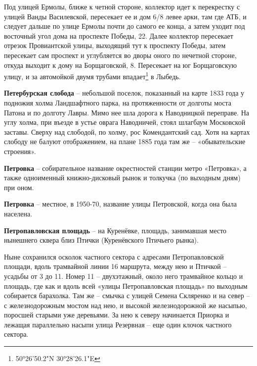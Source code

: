 Под улицей Ермолы, ближе к четной стороне, коллектор идет к перекрестку с улицей Ванды Василевской, пересекает ее и дом 6/8 левее арки, там где АТБ, и следует дальше по улице Ермолы почти до самого ее конца, а затем уходит под восточный угол дома на проспекте Победы, 22. Далее коллектор пересекает отрезок Провиантской улицы, выходящий тут к проспекту Победы, затем пересекает сам проспект и углубляется во дворы оного по нечетной стороне, откуда выходит к дому на Борщаговской, 8. Пересекает на юг Борщаговскую улицу, и за автомойкой двумя трубами впадает\footnote{50°26'50.2"N 30°28'26.1"E} в Лыбедь.\\

\medskip

\textbf{Петербурская слобода} – небольшой поселок, показанный на карте 1833 года у подножия холма Ландшафтного парка, на протяженности от долготы моста Патона и по долготу Лавры. Мимо нее шла дорога к Наводницкой переправе. На углу холма, при въезде в устье оврага Наводничей, стоял шлагбаум Московской заставы. Сверху над слободой, по холму, рос Комендантский сад. Хотя на картах слободу не балуют отображением, на плане 1885 года там же – «обывательские строения».\\

\medskip


\textbf{Петровка} – собирательное название окрестностей станции метро «Петровка», а также одноименный книжно-дисковый рынок и толкучка (по выходным дням) при оном.\\

\medskip


\textbf{Петровка} – местное, в 1950-70, название улицы Петровской, когда она была населена.\\

\medskip

\textbf{Петропавловская площадь} – на Куренёвке, площадь, занимавшая место нынешнего сквера близ Птички (Куренёвского Птичьего рынка). 

Ныне сохранился осколок частного сектора с адресами Петропавловской площади, вдоль трамвайной линии 16 маршрута, между нею и Птичкой – усадьбы от 3 до 11. Номер 11 – двухэтажный, около него трамвайное кольцо и площадь, где как и вдоль всей «улицы Петропавловская площадь» по выходным собирается барахолка. Там же – смычка с улицей Семена Скляренко и на север – с железнодорожным мостом над нею, и высокой железнодорожной же насыпью, поросшей старыми уже деревьями. За нею к северу начинается Приорка и лежащая параллельно насыпи улица Резервная – еще один клочок частного сектора.\\


